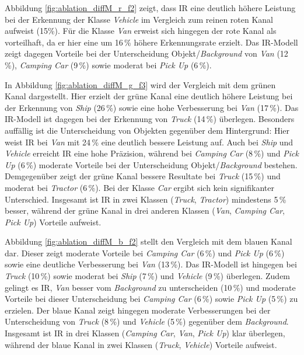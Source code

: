 Abbildung \ref{fig:ablation_diffM_r_f2} zeigt, dass IR eine deutlich höhere Leistung bei der Erkennung der Klasse \textit{Vehicle} im Vergleich zum reinen roten Kanal aufweist (15\%). Für die Klasse \textit{Van} erweist sich hingegen der rote Kanal als vorteilhaft, da er hier eine um 16\,\% höhere Erkennungsrate erzielt. Das IR-Modell zeigt dagegen Vorteile bei der Unterscheidung Objekt/\textit{Background} von \textit{Van} (12\,\%), \textit{Camping Car} (9\,\%) sowie moderat bei \textit{Pick Up} (6\,\%).  

In Abbildung \ref{fig:ablation_diffM_g_f3} wird der Vergleich mit dem grünen Kanal dargestellt. Hier erzielt der grüne Kanal eine deutlich höhere Leistung bei der Erkennung von \textit{Ship} (26\,\%) sowie eine hohe Verbesserung bei \textit{Van} (17\,\%). Das IR-Modell ist dagegen bei der Erkennung von \textit{Truck} (14\,\%) überlegen. Besonders auffällig ist die Unterscheidung von Objekten gegenüber dem Hintergrund: Hier weist IR bei \textit{Van} mit 24\,\% eine deutlich bessere Leistung auf. Auch bei \textit{Ship} und \textit{Vehicle} erreicht IR eine hohe Präzision, während bei \textit{Camping Car} (8\,\%) und \textit{Pick Up} (6\,\%) moderate Vorteile bei der Unterscheidung Objekt/\textit{Background} bestehen. Demgegenüber zeigt der grüne Kanal bessere Resultate bei \textit{Truck} (15\,\%) und moderat bei \textit{Tractor} (6\,\%). Bei der Klasse \textit{Car} ergibt sich kein signifikanter Unterschied. Insgesamt ist IR in zwei Klassen (\textit{Truck}, \textit{Tractor}) mindestens 5\,\% besser, während der grüne Kanal in drei anderen Klassen (\textit{Van}, \textit{Camping Car}, \textit{Pick Up}) Vorteile aufweist.  

Abbildung \ref{fig:ablation_diffM_b_f2} stellt den Vergleich mit dem blauen Kanal dar. Dieser zeigt moderate Vorteile bei \textit{Camping Car} (6\,\%) und \textit{Pick Up} (6\,\%) sowie eine deutliche Verbesserung bei \textit{Van} (13\,\%). Das IR-Modell ist hingegen bei \textit{Truck} (10\,\%) sowie moderat bei \textit{Ship} (7\,\%) und \textit{Vehicle} (9\,\%) überlegen. Zudem gelingt es IR, \textit{Van} besser vom \textit{Background} zu unterscheiden (10\,\%) und moderate Vorteile bei dieser Unterscheidung bei \textit{Camping Car} (6\,\%) sowie \textit{Pick Up} (5\,\%) zu erzielen. Der blaue Kanal zeigt hingegen moderate Verbesserungen bei der Unterscheidung von \textit{Truck} (8\,\%) und \textit{Vehicle} (5\,\%) gegenüber dem \textit{Background}. Insgesamt ist IR in drei Klassen (\textit{Camping Car}, \textit{Van}, \textit{Pick Up}) klar überlegen, während der blaue Kanal in zwei Klassen (\textit{Truck}, \textit{Vehicle}) Vorteile aufweist.  


